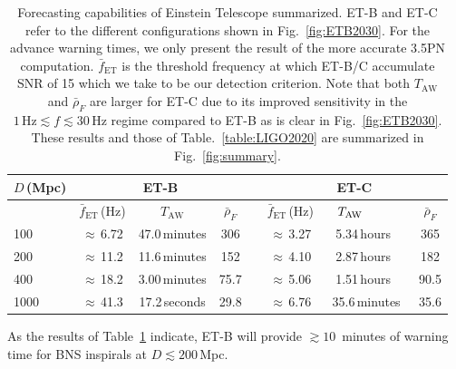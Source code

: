 \documentclass[prd,amsmath,amssymb,aps,floats,amsfonts,notitlepage,superscriptaddress,eqsecnum,nofootinbib,10pt]{revtex4-1}
\newcommand\T{\rule{0pt}{2.6ex}}       %
\newcommand\B{\rule[-1.2ex]{0pt}{0pt}} %
\begin{document}
\begin{table}[h]
\centering
\begin{tabular}{l|ccccccc}
\hline
$D\,$(Mpc) & \multicolumn{3}{c}{ET-B} &  & \multicolumn{3}{c}{ET-C}\T\B\\
\hline
{}& $\bar{f}_\text{ET}\,$(Hz) & \ \hspace{7mm} $T_\text{AW}$ \ \hspace{7mm} & $\bar{\rho}_{F}$ &{} & $\bar{f}_\text{ET}\,$(Hz) & \ \hspace{5mm} $T_\text{AW}\hspace{12mm}$& $\bar{\rho}_{F}$\T\B\\
100 & $\approx\,$6.72 &  47.0\,minutes & 306 &{\qquad} & $\approx\,$3.27 & 5.34\,hours\ & 365\T\\
200 & $\approx\,$11.2 & 11.6\,minutes & 152 &{\qquad} & $\approx\,$4.10 & 2.87\,hours\ & 182 \\
400 & $\approx\,$18.2 & 3.00\,minutes & 75.7 &{\qquad} & $\approx\,$5.06 & 1.51\,hours\ & 90.5\\
1000 & $\approx\,$41.3 &17.2\,seconds & 29.8& \qquad &    $\approx\,$6.76 & 35.6\,minutes & 35.6  \\
\hline
\end{tabular}
\caption{Forecasting capabilities of Einstein Telescope summarized. 
ET-B and ET-C refer to the different configurations shown in Fig.~\ref{fig:ETB2030}. For the advance warning times, we only present the result of the more accurate 3.5PN computation. $\bar{f}_\text{ET}$ is the threshold frequency at which
ET-B/C accumulate SNR of 15 which we take to be our detection criterion. Note that both $T_\text{AW}$ and $\bar\rho_F$ are larger for ET-C
due to its improved sensitivity in the $1\,\text{Hz}\lesssim f\lesssim 30\,$Hz regime compared to ET-B as is clear in Fig.~\ref{fig:ETB2030}.
These results and those of Table.~\ref{table:LIGO2020} are summarized in Fig.~\ref{fig:summary}.}\label{table:ET}
\end{table}
%
%
As the results of Table~\ref{table:ET} indicate, ET-B will provide $\gtrsim 10\,$ minutes of warning time for BNS inspirals at $D\lesssim 200\,$Mpc.
\end{document}
